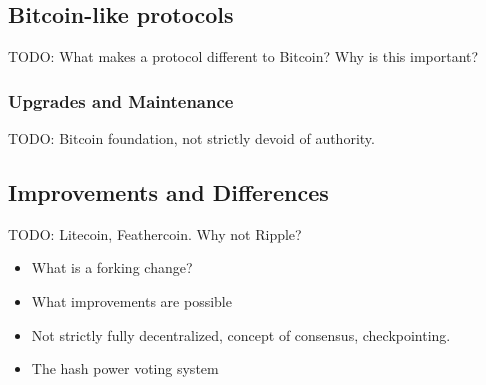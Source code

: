 \subsection{Bitcoin-like protocols}
TODO: What makes a protocol different to Bitcoin? Why is this important?

\subsubsection{Upgrades and Maintenance}
TODO: Bitcoin foundation, not strictly devoid of authority.

\subsection{Improvements and Differences}
TODO: Litecoin, Feathercoin. Why not Ripple?

\begin{itemize} \item What is a forking change?  \item What improvements are
possible \item Not strictly fully decentralized, concept of consensus,
checkpointing.  \item The hash power voting system \end{itemize}


%
%



